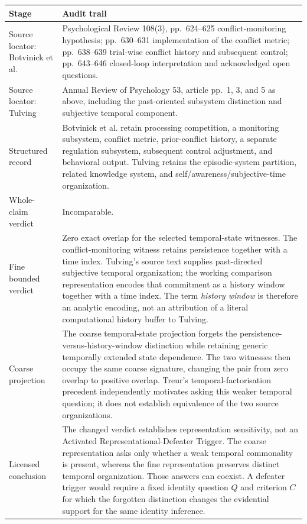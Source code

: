 \documentclass[11pt]{article}
\begin{document}
\begingroup
\small
\begin{tabularx}{\textwidth}{>{\raggedright\arraybackslash}p{} X}
\toprule
Stage & Audit trail \\
\midrule
Source locator: Botvinick et al. & Psychological Review 108(3), pp.~624--625 conflict-monitoring hypothesis; pp.~630--631 implementation of the conflict metric; pp.~638--639 trial-wise conflict history and subsequent control; pp.~643--646 closed-loop interpretation and acknowledged open questions. \\
Source locator: Tulving & Annual Review of Psychology 53, article pp.~1, 3, and 5 as above, including the past-oriented subsystem distinction and subjective temporal component. \\
Structured record & Botvinick et al. retain processing competition, a monitoring subsystem, conflict metric, prior-conflict history, a separate regulation subsystem, subsequent control adjustment, and behavioral output. Tulving retains the episodic-system partition, related knowledge system, and self/awareness/subjective-time organization. \\
Whole-claim verdict & Incomparable. \\
Fine bounded verdict & Zero exact overlap for the selected temporal-state witnesses. The conflict-monitoring witness retains persistence together with a time index. Tulving's source text supplies past-directed subjective temporal organization; the working comparison representation encodes that commitment as a history window together with a time index. The term \emph{history window} is therefore an analytic encoding, not an attribution of a literal computational history buffer to Tulving. \\
Coarse projection & The coarse temporal-state projection forgets the persistence-versus-history-window distinction while retaining generic temporally extended state dependence. The two witnesses then occupy the same coarse signature, changing the pair from zero overlap to positive overlap. Treur's temporal-factorisation precedent independently motivates asking this weaker temporal question; it does not establish equivalence of the two source organizations. \\
Licensed conclusion & The changed verdict establishes representation sensitivity, not an Activated Representational-Defeater Trigger. The coarse representation asks only whether a weak temporal commonality is present, whereas the fine representation preserves distinct temporal organization. Those answers can coexist. A defeater trigger would require a fixed identity question \(Q\) and criterion \(C\) for which the forgotten distinction changes the evidential support for the same identity inference. \\
\bottomrule
\end{tabularx}
\endgroup
\end{document}
